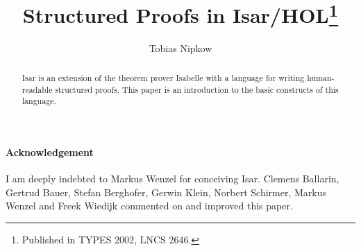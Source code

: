 \documentclass[envcountsame]{llncs}
\begin{document}
\title{%
Structured Proofs in Isar/HOL\thanks{Published in TYPES 2002, LNCS 2646.}}
\author{Tobias Nipkow}
\date{}
\maketitle

\begin{abstract}
  Isar is an extension of the theorem prover Isabelle with a language
  for writing human-readable structured proofs. This paper is an
  introduction to the basic constructs of this language.
\end{abstract}





\small
\paragraph{Acknowledgement}
I am deeply indebted to Markus Wenzel for conceiving Isar. Clemens Ballarin,
Gertrud Bauer, Stefan Berghofer, Gerwin Klein, Norbert Schirmer,
Markus Wenzel and Freek Wiedijk commented on and improved this paper.

\begingroup
 \small\raggedright\frenchspacing

\endgroup
\end{document}
